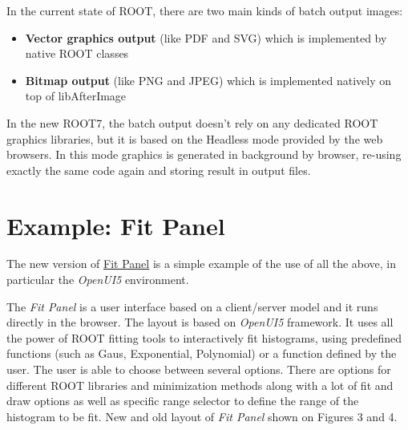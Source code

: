\documentclass[a4paper]{jpconf}
\begin{document}
In the current state of ROOT, there are two main kinds of batch output images:
\begin{itemize}
  \item \textbf{Vector graphics output} (like PDF and SVG) which is implemented by native ROOT classes
  \item \textbf{Bitmap output} (like PNG and JPEG) which is implemented natively on top of libAfterImage
\end{itemize}

In the new ROOT7,  the batch output doesn't rely on any dedicated ROOT graphics
libraries, but it is based on the \textit{}{Headless mode} provided by the web
browsers. In this mode graphics is generated in background by browser, re-using exactly the same code again and storing result in output files. 

\section{Example: Fit Panel}

The new version of \href{https://root.cern.ch/fit-panel}{Fit Panel} is a simple
example of the use of all the above, in particular the \textit{OpenUI5} environment.

The \textit{Fit Panel} is a user interface based on a client/server model and it runs directly
in the browser. The layout is based on \textit{OpenUI5} framework. It uses all the
power of ROOT fitting tools to interactively fit histograms, using predefined
functions (such as Gaus, Exponential, Polynomial) or a function defined by
the user. The user is able to choose between several options. There are options
for different ROOT libraries and minimization methods along with a lot of fit
and draw options as well as specific range selector to define the range of the
histogram to be fit. New and old layout of \textit{Fit Panel} shown on Figures 3 and 4.
\end{document}
